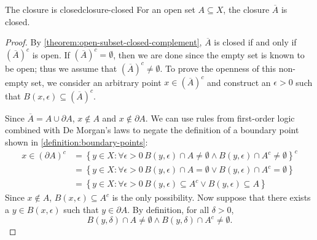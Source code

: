 \documentclass{article}
\numberwithin{equation}{section}
\numberwithin{figure}{section}
\begin{document}
\begin{theorem}{The closure is closed}{closure-closed}
    For an open set $ A \subseteq X $, the closure $ \overline{A} $ is closed.
    \begin{proof}
        By \cref{theorem:open-subset-closed-complement}, $ \overline{A} $ is
        closed if and only if $ \left(\overline{A}\right)^c $ is open. If $
        \left(\overline{A}\right)^c = \emptyset $, then we are done since the
        empty set is known to be open; thus we assume that $
        \left(\overline{A}\right)^c \neq \emptyset $. To prove the openness of
        this non-empty set, we consider an arbitrary point $ x \in
        \left(\overline{A}\right)^c $ and construct an $ \epsilon > 0 $ such
        that $ B(x, \epsilon) \subseteq \left(\overline{A}\right)^c $.

        Since $ \overline{A} = A \cup \partial A $, $ x \not\in A $ and $ x
        \not\in \partial A $. We can use rules from first-order logic combined
        with De Morgan's laws to negate the definition of a boundary point shown
        in \cref{definition:boundary-points}:
        \begin{align}
            x \in \left(\partial A\right)^c &= \left\{ y \in X \colon \forall
                \epsilon > 0 \, B(y, \epsilon) \cap A \neq \emptyset \land B(y,
                \epsilon) \cap A^c \neq \emptyset \right\}^c \\
            &= \left\{ y \in X \colon \forall \epsilon > 0 \, B(y, \epsilon)
                \cap A = \emptyset \lor B(y, \epsilon) \cap A^c = \emptyset
                \right\} \\
            &= \left\{ y \in X \colon \forall \epsilon > 0 \, B(y, \epsilon)
                \subseteq A^c \lor B(y, \epsilon) \subseteq A \right\}
        \end{align}
        Since $ x \not\in A $, $ B(x, \epsilon) \subseteq A^c $ is the only
        possibility. Now suppose that there exists a $ y \in B(x, \epsilon) $
        such that $ y \in \partial A $. By definition, for all $ \delta > 0 $,
        \begin{equation}
            B(y, \delta) \cap A \neq \emptyset \land B(y, \delta) \cap A^c \neq
            \emptyset.
        \end{equation}


\end{proof}
\end{theorem}
\end{document}
